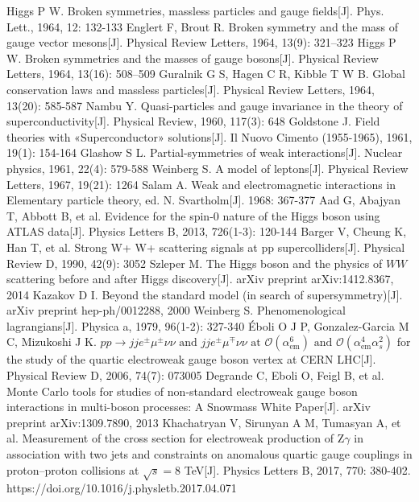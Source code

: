 \documentclass{SCIS2020cn}
\begin{document}
\begin{thebibliography}{99}
 Higgs P W. Broken symmetries, massless particles and gauge fields[J]. Phys. Lett., 1964, 12: 132-133
 Englert F, Brout R. Broken symmetry and the mass of gauge vector mesons[J]. Physical Review Letters, 1964, 13(9): 321–323
 Higgs P W. Broken symmetries and the masses of gauge bosons[J]. Physical Review Letters, 1964, 13(16): 508–509
 Guralnik G S, Hagen C R, Kibble T W B. Global conservation laws and massless particles[J]. Physical Review Letters, 1964, 13(20): 585-587
 Nambu Y. Quasi-particles and gauge invariance in the theory of superconductivity[J]. Physical Review, 1960, 117(3): 648
 Goldstone J. Field theories with «Superconductor» solutions[J]. Il Nuovo Cimento (1955-1965), 1961, 19(1): 154-164
 Glashow S L. Partial-symmetries of weak interactions[J]. Nuclear physics, 1961, 22(4): 579-588
 Weinberg S. A model of leptons[J]. Physical Review Letters, 1967, 19(21): 1264
 Salam A. Weak and electromagnetic interactions in Elementary particle theory, ed. N. Svartholm[J]. 1968: 367-377
 Aad G, Abajyan T, Abbott B, et al. Evidence for the spin-0 nature of the Higgs boson using ATLAS data[J]. Physics Letters B, 2013, 726(1-3): 120-144
 Barger V, Cheung K, Han T, et al. Strong W+ W+ scattering signals at pp supercolliders[J]. Physical Review D, 1990, 42(9): 3052
 Szleper M. The Higgs boson and the physics of $ WW $ scattering before and after Higgs discovery[J]. arXiv preprint arXiv:1412.8367, 2014
 Kazakov D I. Beyond the standard model (in search of supersymmetry)[J]. arXiv preprint hep-ph/0012288, 2000
 Weinberg S. Phenomenological lagrangians[J]. Physica a, 1979, 96(1-2): 327-340
 Éboli O J P, Gonzalez-Garcia M C, Mizukoshi J K. $p p \rightarrow j j e^{\pm} \mu^{\pm} \nu \nu \text { and } j j e^{\pm} \mu^{\mp} \nu \nu \text { at } \mathscr{O}\left(\alpha_{\mathrm{em}}^{6}\right) \text { and } \mathscr{O}\left(\alpha_{\mathrm{em}}^{4} \alpha_{s}^{2}\right)$ for the study of the quartic electroweak gauge boson vertex at CERN LHC[J]. Physical Review D, 2006, 74(7): 073005
 Degrande C, Eboli O, Feigl B, et al. Monte Carlo tools for studies of non-standard electroweak gauge boson interactions in multi-boson processes: A Snowmass White Paper[J]. arXiv preprint arXiv:1309.7890, 2013
 Khachatryan V, Sirunyan A M, Tumasyan A, et al. Measurement of the cross section for electroweak production of Z$\gamma$ in association with two jets and constraints on anomalous quartic gauge couplings in proton–proton collisions at $\sqrt{s} = 8$ TeV[J]. Physics Letters B, 2017, 770: 380-402. https://doi.org/10.1016/j.physletb.2017.04.071

\end{thebibliography}
\end{document}
